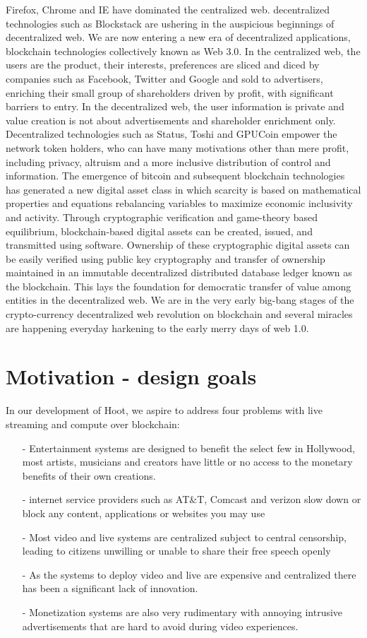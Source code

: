\documentclass{article}
\begin{document}
Firefox, Chrome and IE have dominated the centralized web. decentralized technologies such as Blockstack are ushering in the auspicious beginnings of decentralized web. 
We are now entering a new era of decentralized applications, blockchain technologies collectively known as Web 3.0. In the centralized web, the users are the product, their interests, preferences are sliced and diced by companies such as Facebook, Twitter and Google and sold to advertisers, enriching their small group of shareholders driven by profit, with significant barriers to entry. In the
decentralized web, the user information is private and value creation is not about advertisements and shareholder enrichment only. Decentralized
technologies such as Status, Toshi and GPUCoin empower the network token holders, who can have many motivations other than mere profit, including privacy, altruism and a more inclusive distribution of control and information. The emergence of bitcoin and subsequent blockchain technologies has generated a new digital asset class in which scarcity is based on mathematical properties and equations rebalancing variables to maximize economic inclusivity and activity. Through cryptographic verification and game-theory based equilibrium, blockchain-based digital assets can be created, issued, and transmitted using software. Ownership of these cryptographic digital assets can be easily verified using public key cryptography and transfer of ownership maintained in an immutable decentralized distributed database ledger known as the blockchain. This lays the foundation for democratic transfer of value among entities in the decentralized web.
We are in the very early big-bang stages of the crypto-currency decentralized web revolution on blockchain and several miracles are happening everyday harkening to the early merry days of web 1.0.

\section{Motivation - design goals}
In our development of Hoot, we aspire to address four problems with live streaming and compute over blockchain:
\begin{itemize}
\item[-]Entertainment systems are designed to benefit the select few in Hollywood, most artists, musicians and creators have little or no access to the monetary benefits of their own creations.
\item[-]internet service providers such as AT\&T, Comcast and verizon slow down or block any content, applications or websites you may use
\item[-]Most video and live systems are centralized subject to central censorship, leading to citizens unwilling or unable to share their free speech openly
\item[-]As the systems to deploy video and live are expensive and centralized there has been a significant lack of innovation.
\item[-]Monetization systems are also very rudimentary with annoying intrusive advertisements that are hard to avoid during video experiences. 
\end{itemize}
\end{document}
